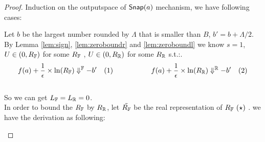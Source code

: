\documentclass[a4paper,11pt]{article}
\begin{document}
\begin{proof}
%
Induction on the outputspace of $\snap(a)$ mechanism, we have following cases:
	\begin{itemize}
		Let $b$ be the largest number rounded by $\Lambda$ that is smaller than $B$, $b' = b + \Lambda / 2$.
		\\
		By Lemma \ref{lem:sign}, \ref{lem:zeroboundr} and \ref{lem:zeroboundl} we know $s = 1$, 
		$U \in (0, \fvarR)$ for some $\fvarR$
		, $U \in (0, \rvarR)$ for some $\rvarR$ s.t.:.
		$$f(a) + \frac{1}{\epsilon} \times \ln(\fvarR) \fbigstep -b' ~~~ (1)
		~~~~~~~~~~~~~~~~
		f(a) + \frac{1}{\epsilon} \times \ln(\rvarR) \rbigstep -b' ~~~ (2)
		$$
		\\
		So we can get $\fvarL = \rvarL = 0$.
		\\
		In order to bound the $\fvarR$ by $\rvarR$, let $\tilde{\fvarR}$ be the real representation of $\fvarR~(\star)$ . we have the derivation as following:
		\\
{\scriptsize
\begin{mathpar}
\end{mathpar}}
\end{itemize}
\end{proof}
\end{document}
